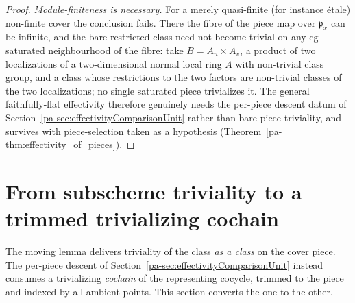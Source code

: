\begin{proof}
  \emph{Module-finiteness is necessary.} For a merely quasi-finite (for instance \'etale) non-finite
  cover the conclusion fails. There the fibre of the piece map over \(\mathfrak p_x\) can be infinite,
  and the bare restricted class need not become trivial on any \(\mathrm{cg}\)-saturated neighbourhood
  of the fibre: take \(B = A_u \times A_v\), a product of two localizations of a two-dimensional
  normal local ring \(A\) with non-trivial class group, and a class whose restrictions to the two
  factors are non-trivial classes of the two localizations; no single saturated piece trivializes it.
  The general faithfully-flat effectivity therefore genuinely needs the per-piece descent datum of
  Section~\ref{pa-sec:effectivityComparisonUnit} rather than bare piece-triviality, and survives with
  piece-selection taken as a hypothesis (Theorem~\ref{pa-thm:effectivity_of_pieces}).
\end{proof}

\section{From subscheme triviality to a trimmed trivializing cochain}
\label{pa-sec:effectivityTrivialization}

The moving lemma delivers triviality of the class \emph{as a class} on the cover piece. The per-piece
descent of Section~\ref{pa-sec:effectivityComparisonUnit} instead consumes a trivializing \emph{cochain}
of the representing cocycle, trimmed to the piece and indexed by all ambient points. This section
converts the one to the other.

